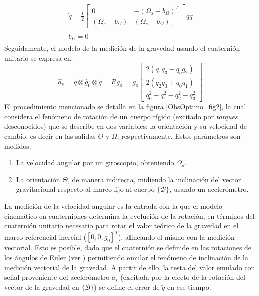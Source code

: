 \documentclass[conference]{IEEEtran}
\newcommand{\marco}[1]{\{\mathcal{#1}\}}
\begin{document}
\begin{gather}\label{chap2:ModeloProceso}
\begin{array}{c}
\dot{q}=\frac{1}{2}\begin{bmatrix} 0&-(\Omega_s-b_\Omega)^T\\ (\Omega_s-b_\Omega)&(\Omega_s-b_\Omega)_\times \end{bmatrix}\breve{q}
q\\
\dot{b}_\Omega=0
\end{array}
\end{gather}
Seguidamente, el modelo de la medición de la gravedad usando el cuaternión unitario \cite{Sola2012} se expresa en:
\begin{equation}\label{chap2:ModeloMedicion}
\hat{a}_s=\bar{\breve{q}}\otimes\breve{g_0}\otimes\breve{q}=Rg_0=g_0\begin{bmatrix}2(q_1q_3-q_oq_2)\\2(q_2q_3+q_0q_1)\\q_0^2-q_1^2-q_2^2-q_3^2\end{bmatrix}
\end{equation}
El procedimiento mencionado se detalla en la figura \ref{ObsOptimo_fig2}, la cual considera el fenómeno de rotación de un cuerpo rígido (excitado por \emph{torques} desconocidos) que se describe en dos variables: la orientación y su velocidad de cambio, es decir en las salidas $\Theta$ y $\Omega$, respectivamente. Estos parámetros son medidos:
\begin{enumerate} 
\item La velocidad angular por un giroscopio, obteniendo $\Omega_s$.
\item La orientación $\Theta$, de manera indirecta, midiendo la inclinación del vector gravitacional respecto al marco fijo al cuerpo $\marco{B}$, usando un acelerómetro.
\end{enumerate}
La medición de la velocidad angular es la entrada con la que el modelo cinemático en cuaterniones determina la evolución de la rotación, en términos del cuaternión unitario necesario para rotar el valor teórico de la gravedad en el marco referencial inercial ($[0,0,g_0]^T$), alineando el mismo con la medición vectorial. Esto es posible, dado que el cuaternión se definide en las rotaciones de los ángulos de Euler (ver \cite{Altmann1986}) permitiendo emular el fenómeno de inclinación de la medición vectorial de la gravedad. A partir de ello, la resta del valor emulado con señal proveniente del acelerómetro $a_s$ (excitada por la efecto de la rotación del vector de la gravedad en $\marco{B}$) se define el error de $\breve{q}$ en ese tiempo.\par
\end{document}

